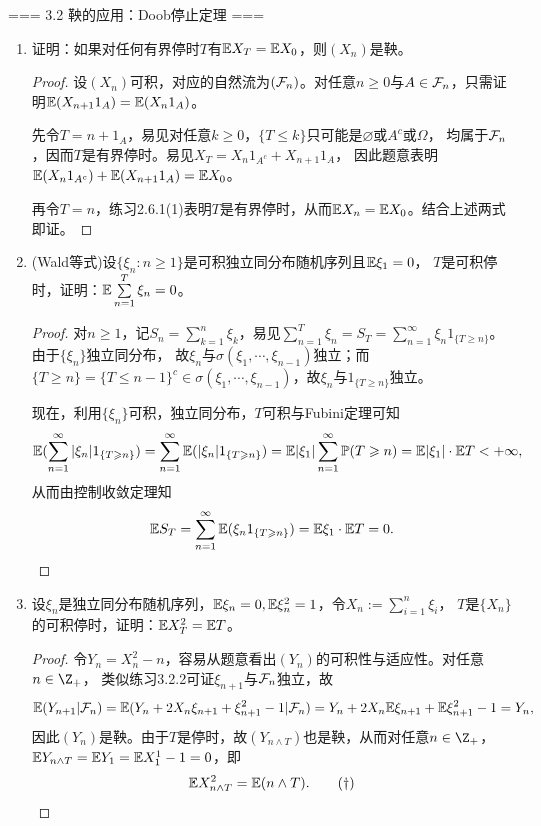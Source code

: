 === 3.2 鞅的应用：Doob停止定理 ===
\begin{enumerate}
    \item[3.2.1] 证明：如果对任何有界停时$T$有$\mathbb{E} X_T=\mathbb{E} X_0$，则$(X_n)$是鞅。
    \begin{proof}
        设$(X_n)$可积，对应的自然流为$(\mathcal{F}_n)$。对任意$n\geqslant0$与$A\in\mathcal{F}_n$，只需证明$\mathbb{E}(X_{n+1}1_A)=\mathbb{E}(X_n1_A)$。

        先令$T=n+1_A$，易见对任意$k\geqslant0$，$\{T\leqslant k\}$只可能是$\varnothing$或$A^c$或$\Omega$，
        均属于$\mathcal{F}_n$，因而$T$是有界停时。易见$X_T=X_n1_{A^c}+X_{n+1}1_A$，
        因此题意表明$\mathbb{E}(X_n1_{A^c})+\mathbb{E}(X_{n+1}1_A)=\mathbb{E} X_0$。

        再令$T=n$，练习2.6.1(1)表明$T$是有界停时，从而$\mathbb{E} X_n=\mathbb{E} X_0$。结合上述两式即证。
    \end{proof}
    \item[3.2.2] (Wald等式)设$\{\xi_n:n\geqslant1\}$是可积独立同分布随机序列且$\mathbb{E}\xi_1=0$，
    $T$是可积停时，证明：$\mathbb{E}\sum\limits_{n=1}^T\xi_n=0$。
    \begin{proof}
        对$n\geqslant1$，记$S_n=\sum\limits_{k=1}^n\xi_k$，易见$\sum\limits_{n=1}^T\xi_n=S_T
        =\sum\limits_{n=1}^\infty\xi_n1_{\{T\geqslant n\}}$。由于$\{\xi_n\}$独立同分布，
        故$\xi_n$与$\sigma(\xi_1,\cdots,\xi_{n-1})$独立；而$\{T\geqslant n\}=\{T\leqslant n-1\}^c
        \in\sigma(\xi_1,\cdots,\xi_{n-1})$，故$\xi_n$与$1_{\{T\geqslant n\}}$独立。

        现在，利用$\{\xi_n\}$可积，独立同分布，$T$可积与Fubini定理可知
        \[\mathbb{E}(\sum_{n=1}^\infty|\xi_n|1_{\{T\geqslant n\}})=\sum_{n=1}^\infty\mathbb{E}(|\xi_n|1_{\{T\geqslant n\}})=\mathbb{E}|\xi_1|\sum_{n=1}^\infty\mathbb{P}(T\geqslant n)=\mathbb{E}|\xi_1|\cdot\mathbb{E} T<+\infty,\]
        从而由控制收敛定理知\[\mathbb{E} S_T=\sum_{n=1}^\infty\mathbb{E}(\xi_n1_{\{T\geqslant n\}})=\mathbb{E}\xi_1\cdot\mathbb{E} T=0.\]
    \end{proof}
    \item[3.2.3] 设$\xi_n$是独立同分布随机序列，$\mathbb{E}\xi_n=0,\mathbb{E}\xi_n^2=1$，令$X_n:=\sum\limits_{i=1}^n\xi_i$，
    $T$是$\{X_n\}$的可积停时，证明：$\mathbb{E} X_T^2=\mathbb{E} T$。
    \begin{proof}
        令$Y_n=X_n^2-n$，容易从题意看出$(Y_n)$的可积性与适应性。对任意$n\in\Z_+$，
        类似练习3.2.2可证$\xi_{n+1}$与$\mathcal{F}_n$独立，故\[\mathbb{E}(Y_{n+1}|\mathcal{F}_n)=
        \mathbb{E}(Y_n+2X_n\xi_{n+1}+\xi_{n+1}^2-1|\mathcal{F}_n)=Y_n+2X_n\mathbb{E}\xi_{n+1}+\mathbb{E}\xi_{n+1}^2-1=Y_n,\]
        因此$(Y_n)$是鞅。由于$T$是停时，故$(Y_{n\land T})$也是鞅，从而对任意$n\in\Z_+$，
        $\mathbb{E} Y_{n\land T}=\mathbb{E} Y_1=\mathbb{E} X_1^1-1=0$，即
        \begin{equation*}
            \mathbb{E} X_{n\land T}^2=\mathbb{E}(n\land T). \tag{\dag}
        \end{equation*}
        

\end{proof}
\end{enumerate}

